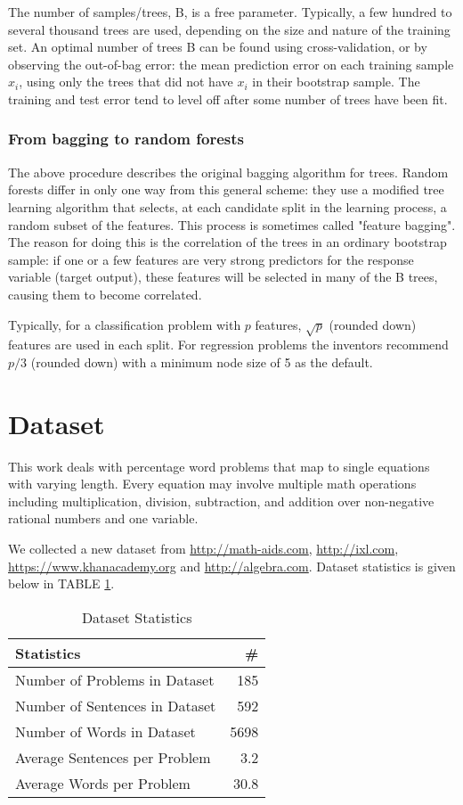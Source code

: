 \documentclass[document.tex]{subfiles}
\begin{document}
The number of samples/trees, B, is a free parameter. Typically, a few hundred to several thousand trees are used, depending on the size and nature of the training set. An optimal number of trees B can be found using cross-validation, or by observing the out-of-bag error: the mean prediction error on each training sample $x_i$, using only the trees that did not have $x_i$ in their bootstrap sample. The training and test error tend to level off after some number of trees have been fit.

\subsubsection{From bagging to random forests}
The above procedure describes the original bagging algorithm for trees. Random forests differ in only one way from this general scheme: they use a modified tree learning algorithm that selects, at each candidate split in the learning process, a random subset of the features. This process is sometimes called "feature bagging". The reason for doing this is the correlation of the trees in an ordinary bootstrap sample: if one or a few features are very strong predictors for the response variable (target output), these features will be selected in many of the B trees, causing them to become correlated.

Typically, for a classification problem with $p$ features, $\sqrt{p}$ (rounded down) features are used in each split. For regression problems the inventors recommend $p/3$ (rounded down) with a minimum node size of 5 as the default.
		
\section{Dataset}
This work deals with percentage word problems that map to single equations with varying length. Every equation may involve multiple math operations including multiplication, division, subtraction, and addition over non-negative rational numbers and one variable. 

We collected a new dataset from \url{http://math-aids.com}, \url{http://ixl.com}, \url{https://www.khanacademy.org} and \url{http://algebra.com}. Dataset statistics is given below in TABLE \ref{tab:datasetstat}.

\begin{table}[H]
	\caption{Dataset Statistics}
	\begin{center}
		\begin{tabular}{|l | r|}
			\hline
			\textbf{Statistics}& \# \\ \hline
			Number of Problems in Dataset& 185 \\
			Number of Sentences in Dataset& 592\\
			Number of Words in Dataset& 5698\\
			Average Sentences per Problem& 3.2\\
			Average Words per Problem& 30.8\\
			\hline
		\end{tabular}
	\end{center}
	\label{tab:datasetstat}
\end{table}
\end{document}
